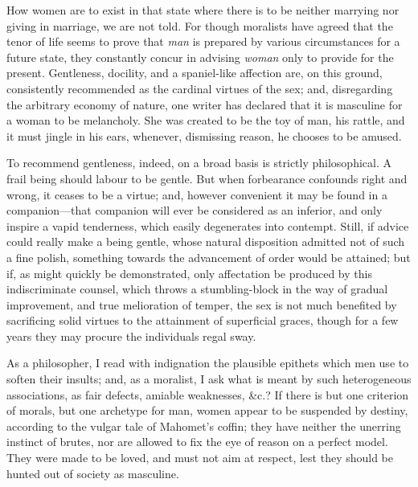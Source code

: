 How women are to exist in that state where there is to be neither
marrying nor giving in marriage, we are not told. For though moralists
have agreed that the tenor of life seems to prove that \textit{man} is
prepared by various circumstances for a future state, they constantly
concur in advising \textit{woman} only to provide for the present.
Gentleness, docility, and a spaniel-like affection are, on this
ground, consistently recommended as the cardinal virtues  of
the sex; and, disregarding the arbitrary economy of nature, one writer
has declared that it is masculine for a woman to be melancholy. She
was created to be the toy of man, his rattle, and it must jingle in
his ears, whenever, dismissing reason, he chooses to be amused.


To recommend gentleness, indeed, on a broad basis is strictly
philosophical. A frail being should labour to be gentle. But when
forbearance confounds right and wrong, it ceases to be a virtue; and,
however convenient it may be found in a com\-pan\-ion---that companion
will ever be considered as an inferior, and only inspire a vapid
tenderness, which easily degenerates into contempt. Still, if advice
could really make a being gentle, whose natural disposition admitted
not of such a fine polish, something towards the advancement of order
would be attained; but if, as might quickly be demonstrated, only
affectation be produced by this indiscriminate counsel, which throws a
stumbling-block in the way of gradual improvement, and true
melioration of temper, the sex is not much benefited by sacrificing
solid virtues to the attainment of superficial graces, though for a
few years  they may procure the individuals regal sway.

As a philosopher, I read with indignation the plausible epithets which
men use to soften their insults; and, as a moralist, I ask what is
meant by such heterogeneous associations, as fair defects, amiable
weaknesses, \&c.? If there is but one criterion of morals, but one
archetype for man, women appear to be suspended by destiny, according
to the vulgar tale of Mahomet's coffin; they have neither the unerring
instinct of brutes, nor are allowed to fix the eye of reason on a
perfect model. They were made to be loved, and must not aim at
respect, lest they should be hunted out of society as masculine.

